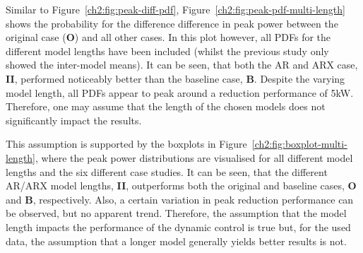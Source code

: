 

Similar to Figure~\ref{ch2:fig:peak-diff-pdf}, Figure~\ref{ch2:fig:peak-pdf-multi-length} shows the probability for the difference difference in peak power between the original case (\textbf{O}) and all other cases.
In this plot however, all PDFs for the different model lengths have been included (whilst the previous study only showed the inter-model means).
It can be seen, that both the AR and ARX case, \textbf{II}, performed noticeably better than the baseline case, \textbf{B}.
Despite the varying model length, all PDFs appear to peak around a reduction performance of 5kW.
Therefore, one may assume that the length of the chosen models does not significantly impact the results.



This assumption is supported by the boxplots in Figure~\ref{ch2:fig:boxplot-multi-length}, where the peak power distributions are visualised for all different model lengths and the six different case studies.
It can be seen, that the different AR/ARX model lengths, \textbf{II}, outperforms both the original and baseline cases, \textbf{O} and \textbf{B}, respectively.
Also, a certain variation in peak reduction performance can be observed, but no apparent trend.
Therefore, the assumption that the model length impacts the performance of the dynamic control is true but, for the used data, the assumption that a longer model generally yields better results is not.



